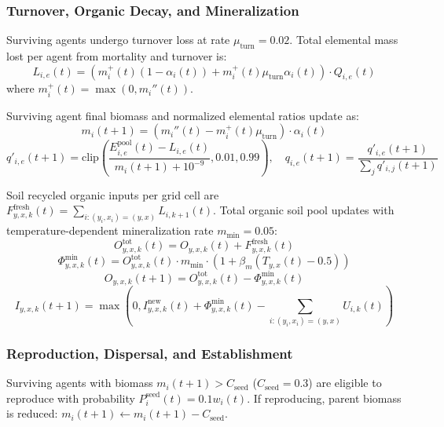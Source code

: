 \documentclass[11pt,a4paper]{article}
\begin{document}
\subsubsection{Turnover, Organic Decay, and Mineralization}
Surviving agents undergo turnover loss at rate $\mu_{\text{turn}} = 0.02$. Total elemental mass lost per agent from mortality and turnover is:
\begin{equation}
L_{i, e}(t) = \left(m_i^+(t) (1 - \alpha_i(t)) + m_i^+(t) \mu_{\text{turn}} \alpha_i(t)\right) \cdot Q_{i, e}(t)
\end{equation}
where $m_i^+(t) = \max(0, m_i''(t))$.

Surviving agent final biomass and normalized elemental ratios update as:
\begin{equation}
m_i(t+1) = \left(m_i''(t) - m_i^+(t) \mu_{\text{turn}}\right) \cdot \alpha_i(t)
\end{equation}
\begin{equation}
q'_{i, e}(t+1) = \text{clip}\left(\frac{E_{i, e}^{\text{pool}}(t) - L_{i, e}(t)}{m_i(t+1) + 10^{-9}}, 0.01, 0.99\right), \quad q_{i, e}(t+1) = \frac{q'_{i, e}(t+1)}{\sum_j q'_{i, j}(t+1)}
\end{equation}

Soil recycled organic inputs per grid cell are $F^{\text{fresh}}_{y,x,k}(t) = \sum_{i: (y_i,x_i)=(y,x)} L_{i, k+1}(t)$. Total organic soil pool updates with temperature-dependent mineralization rate $m_{\text{min}} = 0.05$:
\begin{equation}
O^{\text{tot}}_{y,x,k}(t) = O_{y,x,k}(t) + F^{\text{fresh}}_{y,x,k}(t)
\end{equation}
\begin{equation}
\Phi^{\text{min}}_{y,x,k}(t) = O^{\text{tot}}_{y,x,k}(t) \cdot m_{\text{min}} \cdot \left(1 + \beta_m (T_{y,x}(t) - 0.5)\right)
\end{equation}
\begin{equation}
O_{y,x,k}(t+1) = O^{\text{tot}}_{y,x,k}(t) - \Phi^{\text{min}}_{y,x,k}(t)
\end{equation}
\begin{equation}
I_{y,x,k}(t+1) = \max\left(0, I^{\text{new}}_{y,x,k}(t) + \Phi^{\text{min}}_{y,x,k}(t) - \sum_{i: (y_i,x_i)=(y,x)} U_{i, k}(t)\right)
\end{equation}

\subsubsection{Reproduction, Dispersal, and Establishment}
Surviving agents with biomass $m_i(t+1) > C_{\text{seed}}$ ($C_{\text{seed}} = 0.3$) are eligible to reproduce with probability $P_i^{\text{seed}}(t) = 0.1 w_i(t)$. If reproducing, parent biomass is reduced: $m_i(t+1) \leftarrow m_i(t+1) - C_{\text{seed}}$.
\end{document}
